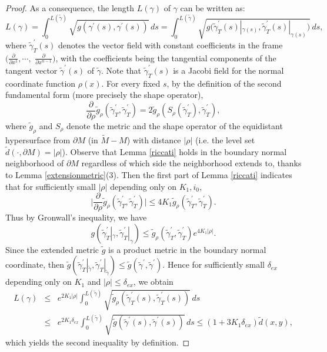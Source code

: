 \documentclass[11pt,letterpaper]{amsart}
\numberwithin{equation}{section}
\theoremstyle{definition}
\theoremstyle{plain}
\theoremstyle{definition}
\theoremstyle{plain}
\theoremstyle{definition}
\theoremstyle{plain}
\begin{document}
\begin{proof}
As a consequence, the length $L(\gamma)$ of $\gamma$ can be written as:
$$L(\gamma)=\int_0^{L(\widetilde{\gamma})} \sqrt{g(\gamma^{\prime}(s),\gamma^{\prime}(s))} \,ds = \int_0^{L(\widetilde{\gamma})} \sqrt{g \big(\widetilde{\gamma}^{\prime}_T(s)|_{\gamma(s)},\widetilde{\gamma}^{\prime}_T(s)|_{\gamma(s)} \big)} \,ds,$$
where $\widetilde{\gamma}^{\prime}_T(s)$ denotes the vector field with constant coefficients in the frame $(\frac{\partial}{\partial x^1},\cdots,$ $\frac{\partial}{\partial x^{n-1}})$, with the coefficients being the tangential components of the tangent vector $\widetilde{\gamma}^{\prime}(s)$ of $\widetilde{\gamma}$.
Note that $\widetilde{\gamma}^{\prime}_T(s)$ is a Jacobi field for the normal coordinate function $\rho(x)$. For every fixed $s$,
by the definition of the second fundamental form (more precisely the shape operator),
$$\frac{\partial}{\partial \rho}\widetilde{g}_{\rho}(\widetilde{\gamma}^{\prime}_T,\widetilde{\gamma}^{\prime}_T) = 2\widetilde{g}_{\rho}(S_{\rho}(\widetilde{\gamma}^{\prime}_T),\widetilde{\gamma}^{\prime}_T),$$
where $\widetilde{g}_{\rho}$ and $S_{\rho}$ denote the metric and the shape operator of the equidistant hypersurface from $\partial M$ (in $\widetilde{M}-M$) with distance $|\rho|$ (i.e. the level set $\widetilde{d}(\cdot,\partial M)=|\rho|$). Observe that Lemma \ref{riccati} holds in the boundary normal neighborhood of $\partial M$ regardless of which side the neighborhood extends to, thanks to Lemma \ref{extensionmetric}(3). Then the first part of Lemma \ref{riccati} indicates that for sufficiently small $|\rho|$ depending only on $K_1,i_0$,
$$\big|\frac{\partial}{\partial \rho}\widetilde{g}_{\rho}(\widetilde{\gamma}^{\prime}_T,\widetilde{\gamma}^{\prime}_T) \big| \leqslant 4K_1\widetilde{g}_{\rho}(\widetilde{\gamma}^{\prime}_T,\widetilde{\gamma}^{\prime}_T).$$
Thus by Gronwall's inequality, we have
$$g(\widetilde{\gamma}^{\prime}_T|_{\gamma},\widetilde{\gamma}^{\prime}_T|_{\gamma}) \leqslant \widetilde{g}_{\rho}(\widetilde{\gamma}^{\prime}_T,\widetilde{\gamma}^{\prime}_T) e^{4K_1|\rho|}.$$
Since the extended metric $\widetilde{g}$ is a product metric in the boundary normal coordinate, then $\widetilde{g}(\widetilde{\gamma}^{\prime}_T|_{\widetilde{\gamma}},\widetilde{\gamma}^{\prime}_T|_{\widetilde{\gamma}})\leqslant \widetilde{g}(\widetilde{\gamma}^{\prime},\widetilde{\gamma}^{\prime})$. Hence for sufficiently small $\delta_{ex}$ depending only on $K_1$ and $|\rho|\leqslant \delta_{ex}$, we obtain
\begin{eqnarray*}
L(\gamma) &\leqslant& e^{2K_1|\rho|} \int_0^{L(\widetilde{\gamma})} \sqrt{\widetilde{g}_{\rho}(\widetilde{\gamma}^{\prime}_T(s),\widetilde{\gamma}^{\prime}_T(s))}\, ds\\
&\leqslant& e^{2K_1 \delta_{ex}} \int_0^{L(\widetilde{\gamma})} \sqrt{\widetilde{g}(\widetilde{\gamma}^{\prime}(s),\widetilde{\gamma}^{\prime}(s))} \, ds \leqslant (1+3K_1\delta_{ex})\widetilde{d}(x,y),
\end{eqnarray*}
which yields the second inequality by definition.


\end{proof}
\end{document}
